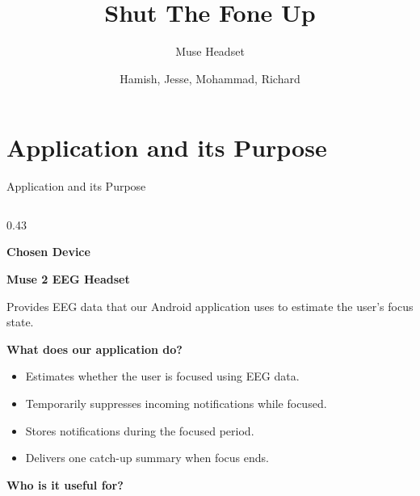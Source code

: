 \documentclass[aspectratio=169,11pt]{beamer}
\title{Shut The Fone Up}
\subtitle{Muse Headset}
\author{Hamish, Jesse, Mohammad, Richard}
\institute{University of Waikato}
\begin{document}
\maketitle


\section{Application and its Purpose}

\begin{frame}{Application and its Purpose}

\begin{columns}[T]

    \begin{column}{0.43\textwidth}

        \textbf{Chosen Device}

        \vspace{0.15cm}

        \textbf{Muse 2 EEG Headset}

        \vspace{0.15cm}

        Provides EEG data that our Android application uses
        to estimate the user's focus state.

        \vspace{0.35cm}

        \textbf{What does our application do?}

        \vspace{0.15cm}

        \begin{itemize}
            \item Estimates whether the user is focused using EEG data.
            \item Temporarily suppresses incoming notifications while focused.
            \item Stores notifications during the focused period.
            \item Delivers one catch-up summary when focus ends.
        \end{itemize}

        \vspace{0.25cm}

        \textbf{Who is it useful for?}

        \vspace{0.15cm}


\end{column}
\end{columns}
\end{frame}
\end{document}
